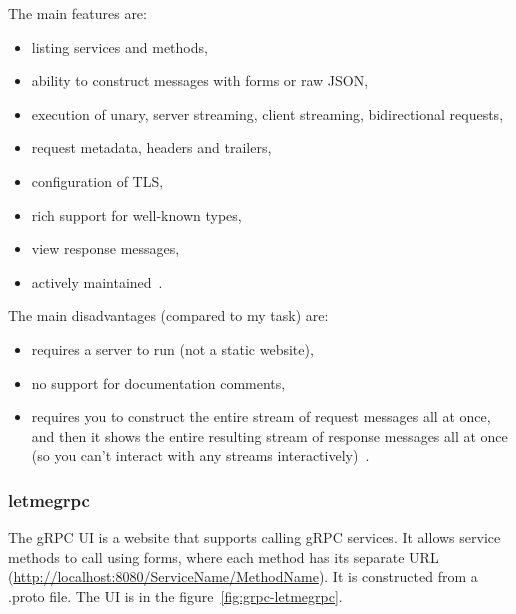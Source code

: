 The main features are:
\begin{itemize}
    \item listing services and methods,
    \item ability to construct messages with forms or raw JSON,
    \item execution of unary, server streaming, client streaming, bidirectional requests,
    \item request metadata, headers and trailers,
    \item configuration of TLS,
    \item rich support for well-known types,
    \item view response messages,
    \item actively maintained~\cite{grpc-grpcui}.
\end{itemize}

The main disadvantages (compared to my task) are:
\begin{itemize}
    \item requires a server to run (not a static website),
    \item no support for documentation comments,
    \item requires you to construct the entire stream of request messages all at once, and then it shows the entire resulting stream of response messages all at once (so you can't interact with any streams interactively)~\cite{grpc-grpcui}.
\end{itemize}

\subsubsection{letmegrpc}
The gRPC UI is a website that supports calling gRPC services.
It allows service methods to call using forms, where each method has its separate URL (\url{http://localhost:8080/ServiceName/MethodName}).
It is constructed from a .proto file.
The UI is in the figure~\ref{fig:grpc-letmegrpc}.
\cite{grpc-letmegrpc}


